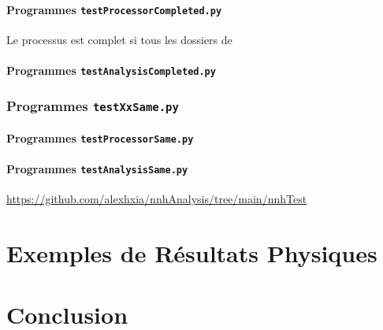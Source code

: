 \documentclass[10pt,a4paper]{report}
\begin{document}
\subsubsection{Programmes \texttt{testProcessorCompleted.py}}

Le processus est complet si tous les dossiers de 

\subsubsection{Programmes \texttt{testAnalysisCompleted.py}}


\subsection{Programmes \texttt{testXxSame.py}}

\subsubsection{Programmes \texttt{testProcessorSame.py}}

\subsubsection{Programmes \texttt{testAnalysisSame.py}}



\url{https://github.com/alexhxia/nnhAnalysis/tree/main/nnhTest}


\chapter{Exemples de Résultats Physiques}

\chapter{Conclusion}


\end{document}
